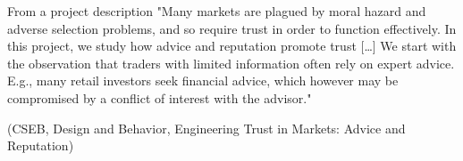 \documentclass[bigger]{beamer}
\newcommand{\backupend}{ \addtocounter{framenumberappendix}{-\value{framenumber}}  \addtocounter{framenumber}{\value{framenumberappendix}}}
\begin{document}
\begin{frame}[label={sec:org29280ce}]{From a project description}
"Many markets are plagued by moral hazard and adverse selection problems, and so require trust in order to function effectively. In this project, we study how advice and reputation promote trust [\ldots{}] We start with the observation that traders with limited information often rely on expert advice. E.g., many retail investors seek financial advice, which however may be compromised by a conflict of interest with the advisor."\par 
(CSEB, Design and Behavior, Engineering Trust in Markets: Advice and Reputation)

\backupend
\end{frame}
\end{document}
